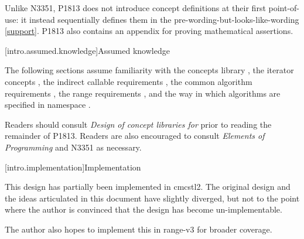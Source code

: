 Unlike N3351, P1813 does not introduce concept definitions at their first point-of-use: it instead
sequentially defines them in the pre-wording-but-looks-like-wording \ref{support}. P1813 also
contains an appendix for proving mathematical assertions.

[intro.assumed.knowledge]{Assumed knowledge}

The following sections assume familiarity with the concepts library , the
iterator concepts , the indirect callable requirements
, the common algorithm requirements , the range
requirements , and the way in which algorithms are specified in namespace
 .

Readers should consult \textit{Design of concept libraries for \Cpp{}}\cite{concept-design} prior to
reading the remainder of P1813. Readers are also encouraged to consult \textit{Elements of
Programming}\cite{EoP} and N3351 as necessary.

[intro.implementation]{Implementation}

This design has partially been implemented in cmcstl2. The original design and the ideas articulated
in this document have slightly diverged, but not to the point where the author is convinced that the
design has become un-implementable.

The author also hopes to implement this in range-v3 for broader coverage.
